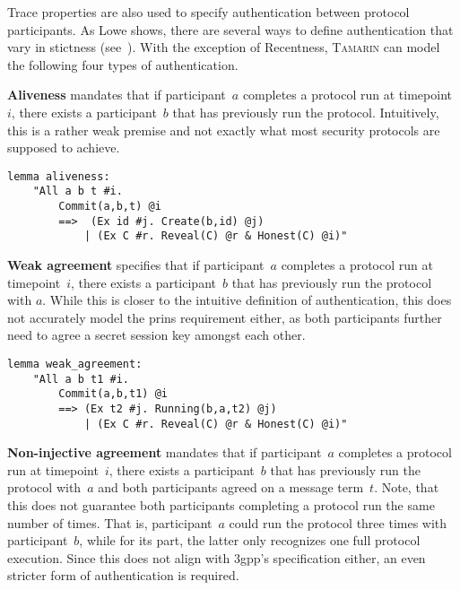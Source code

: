 Trace properties are also used to specify authentication between protocol participants.
As Lowe shows, there are several ways to define authentication that vary in stictness (see~\cite{lowe1997hierarchy}).
With the exception of Recentness, \textsc{Tamarin} can model the following four types of authentication.

\textbf{Aliveness} mandates that if participant~$a$ completes a protocol run at timepoint~$i$, there exists a participant~$b$ that has previously run the protocol.
Intuitively, this is a rather weak premise and not exactly what most security protocols are supposed to achieve.

\begin{lstlisting}[caption={Tamarin aliveness query, according to \cite{tamarin2019manual},~p.~74},label={lst:tamarin-aliveness}]
lemma aliveness:
    "All a b t #i.
        Commit(a,b,t) @i
        ==>  (Ex id #j. Create(b,id) @j)
            | (Ex C #r. Reveal(C) @r & Honest(C) @i)"
\end{lstlisting}

\textbf{Weak agreement} specifies that if participant~$a$ completes a protocol run at timepoint~$i$, there exists a participant~$b$ that has previously run the protocol with $a$.
While this is closer to the intuitive definition of authentication, this does not accurately model the \gls{prins} requirement either, as both participants further need to agree a secret session key amongst each other.

\begin{lstlisting}[caption={Tamarin weak agreement query, according to \cite{tamarin2019manual},~p.~75},label={lst:tamarin-wagreement}]
lemma weak_agreement:
    "All a b t1 #i.
        Commit(a,b,t1) @i
        ==> (Ex t2 #j. Running(b,a,t2) @j)
            | (Ex C #r. Reveal(C) @r & Honest(C) @i)"
\end{lstlisting}

\textbf{Non-injective agreement} mandates that if participant~$a$ completes a protocol run at timepoint~$i$, there exists a participant~$b$ that has previously run the protocol with~$a$ and both participants agreed on a message term~$t$.
Note, that this does not guarantee both participants completing a protocol run the same number of times.
That is, participant~$a$ could run the protocol three times with participant~$b$, while for its part, the latter only recognizes one full protocol execution.
Since this does not align with \gls{3gpp}'s specification either, an even stricter form of authentication is required.

